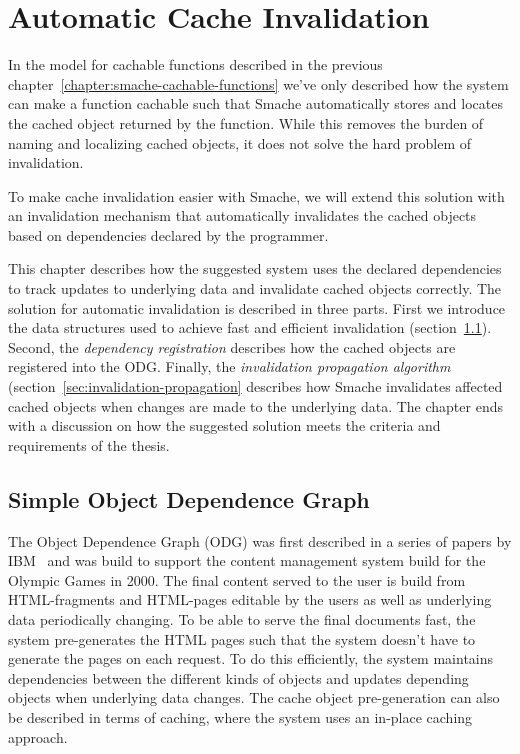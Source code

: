 \chapter{Automatic Cache Invalidation}
\label{chapter:invalidation}

In the model for cachable functions described in the previous chapter~\ref{chapter:smache-cachable-functions} we've only described how the system can make a function cachable such that Smache automatically stores and locates the cached object returned by the function. While this removes the burden of naming and localizing cached objects, it does not solve the hard problem of invalidation.

To make cache invalidation easier with Smache, we will extend this solution with an invalidation mechanism that automatically invalidates the cached objects based on dependencies declared by the programmer.

This chapter describes how the suggested system uses the declared dependencies to track updates to underlying data and invalidate cached objects correctly. The solution for automatic invalidation is described in three parts. First we introduce the data structures used to achieve fast and efficient invalidation (section~\ref{sec:simple-object-dependence-graph}). Second, the \emph{dependency registration} describes how the cached objects are registered into the ODG. Finally, the \emph{invalidation propagation algorithm} (section~\ref{sec:invalidation-propagation} describes how Smache invalidates affected cached objects when changes are made to the underlying data. The chapter ends with a discussion on how the suggested solution meets the criteria and requirements of the thesis.


\section{Simple Object Dependence Graph}
\label{sec:simple-object-dependence-graph}

The Object Dependence Graph (ODG) was first described in a series of papers by IBM~\cite{paper:ibm, paper:ibm-extended} and was build to support the content management system build for the Olympic Games in 2000. The final content served to the user is build from HTML-fragments and HTML-pages editable by the users as well as underlying data periodically changing. To be able to serve the final documents fast, the system pre-generates the HTML pages such that the system doesn't have to generate the pages on each request. To do this efficiently, the system maintains dependencies between the different kinds of objects and updates depending objects when underlying data changes. The cache object pre-generation can also be described in terms of caching, where the system uses an in-place caching approach.


